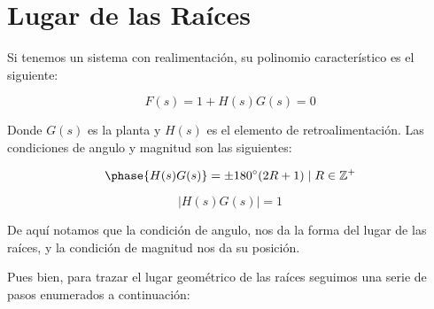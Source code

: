
\chapter{Lugar de las Raíces}


	Si tenemos un sistema con realimentación, su polinomio característico es el siguiente:

	\begin{equation}
		F(s) = 1 + H(s) G(s) = 0
	\end{equation}

	Donde $G(s)$ es la planta y $H(s)$ es el elemento de retroalimentación. Las condiciones de angulo y magnitud son las siguientes:

	\begin{equation}
		\phase{H(s) G(s)} = \pm 180^{\circ} (2R + 1) \mid R \in \mathbb{Z}^+
	\end{equation}

	\begin{equation}
		\lvert H(s) G(s) \rvert = 1
	\end{equation}

	De aquí notamos que la condición de angulo, nos da la forma del lugar de las raíces, y la condición de magnitud nos da su posición.

	Pues bien, para trazar el lugar geométrico de las raíces seguimos una serie de pasos enumerados a continuación:


